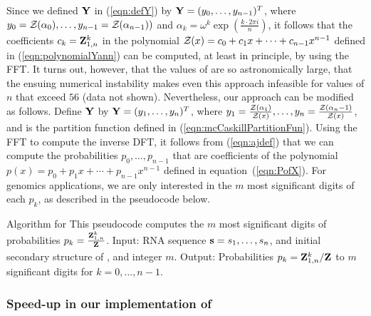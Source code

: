 Since we defined $\bf Y$ in (\ref{eqn:defY}) by ${\bf Y} =
(y_0,\ldots,y_{n-1})^T$, where
$y_0={\mathcal Z}_{}(\alpha_0),\ldots, y_{n-1}={\mathcal Z}_{}(\alpha_{n-1}))$ and $\alpha_k = \omega^k
\exp(\frac{k \cdot 2\pi i}{n})$, it follows that the coefficients
$c_k={\bf Z}^{k}_{1,n}$ in the polynomial
${\mathcal Z}_{}(x) = c_0 + c_1 x + \cdots + c_{n-1} x^{n-1}$ defined in
(\ref{eqn:polynomialYann}) can be computed, at least in principle,
by using the FFT. It turns out, however, that the values of
 are so astronomically large, that the ensuing numerical
instability makes even this approach infeasible for values of $n$
that exceed $56$ (data not shown).
Nevertheless, our approach can be modified as follows.
Define $\bf Y$ by ${\bf Y} = (y_1,\ldots,y_n)^T$, where
$y_1=\frac{{\mathcal Z}_{}(\alpha_1)}{{\mathcal Z}_{}(x)},\ldots, y_{n}=\frac{{\mathcal Z}_{}(\alpha_n-1)}{{\mathcal Z}_{}(x)}$, and
\bfZ{}{} is the partition function defined in (\ref{eqn:mcCaskillPartitionFun}).
Using the FFT to compute the inverse DFT, it follows from
(\ref{eqn:ajdef}) that we can compute the probabilities $p_0,\ldots,p_{n-1}$
that are coefficients of the polynomial
$p(x)=p_0+p_1 x + \cdots + p_{n-1}x^{n-1}$
defined in equation~(\ref{eqn:PofX}). For genomics applications, we are
only interested in the $m$ most significant digits of each $p_k$, as described
in the pseudocode below.
\medskip

\noindent
{\sc Algorithm} for \fftbor\hfill\break
This pseudocode computes the $m$ most significant digits
of probabilities $p_k = \frac{{\bf Z}^{k}_{1,n}}{{\bf Z}^{}_{}}$. \hfill\break
{\sc Input:} RNA sequence ${\bf s}=s_1,\ldots,s_n$, and initial secondary
structure \strSt of \seq, and integer $m$. \hfill\break
{\sc Output:} Probabilities $p_k={\bf Z}^{k}_{1,n}/{\bf Z}^{}_{}$ to $m$ significant digits for $k=0,\ldots,n-1$. \hfill\break
\smallskip
\medskip

\subsubsection*{Speed-up in our implementation of \fftbor}

